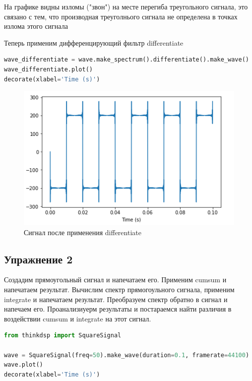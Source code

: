 На графике видны изломы ("звон") на месте перегиба треугольного сигнала, это связано с тем, что производная треуголнього сигнала не определена в точках излома этого сигнала

Теперь применим дифференцирующий фильтр differentiate

\begin{lstlisting}[language=Python]
wave_differentiate = wave.make_spectrum().differentiate().make_wave()
wave_differentiate.plot()
decorate(xlabel='Time (s)')
\end{lstlisting}

\begin{figure}[H]
	\begin{center}
		\includegraphics[scale=1]{fig/lab09/lab09_03.png}
		\caption{Сигнал после применения differentiate}
	\end{center}
\end{figure}


\subsection{Упражнение 2}

Создадим прямоугольный сигнал и напечатаем его. Применим cumsum и напечатаем результат. Вычислим спектр прямогоульного сигнала, применим integrate и напечатаем результат. Преобразуем спектр обратно в сигнал и напечаем его. Проанализиуерм результаты и постараемся найти различия в воздействии cumsum и integrate на этот сигнал.

\begin{lstlisting}[language=Python]
from thinkdsp import SquareSignal

wave = SquareSignal(freq=50).make_wave(duration=0.1, framerate=44100)
wave.plot()
decorate(xlabel='Time (s)')
\end{lstlisting}

